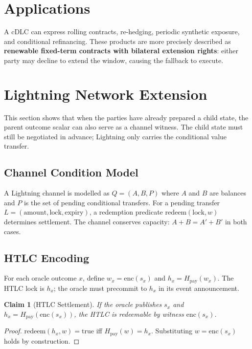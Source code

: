 \documentclass[11pt,a4paper]{article}
\theoremstyle{claimstyle}
\newtheorem{claim}{Claim}[section]
\begin{document}
\section{Applications}

A cDLC can express rolling contracts, re-hedging, periodic synthetic exposure,
and conditional refinancing. These products are more precisely described as
\textbf{renewable fixed-term contracts with bilateral extension rights}: either
party may decline to extend the window, causing the fallback to execute.

\section{Lightning Network Extension}

This section shows that when the parties have already prepared a child state,
the parent outcome scalar can also serve as a channel witness. The child state
must still be negotiated in advance; Lightning only carries the conditional
value transfer.

\subsection{Channel Condition Model}

A Lightning channel is modelled as $Q = (A, B, P)$ where $A$ and $B$ are
balances and $P$ is the set of pending conditional transfers. For a pending
transfer $L = (\mathrm{amount}, \mathrm{lock}, \mathrm{expiry})$, a redemption
predicate $\mathrm{redeem}(\mathrm{lock}, w)$ determines settlement. The channel
conserves capacity: $A + B = A' + B'$ in both cases.

\subsection{HTLC Encoding}

For each oracle outcome $x$, define $w_x = \mathrm{enc}(s_x)$ and $h_x =
H_{\mathrm{pay}}(w_x)$. The HTLC lock is $h_x$; the oracle must precommit to
$h_x$ in its event announcement.

\begin{claim}[HTLC Settlement]
If the oracle publishes $s_x$ and $h_x = H_{\mathrm{pay}}(\mathrm{enc}(s_x))$,
the HTLC is redeemable by witness $\mathrm{enc}(s_x)$.
\end{claim}
\begin{proof}
$\mathrm{redeem}(h_x, w) = \mathrm{true}$ iff $H_{\mathrm{pay}}(w) = h_x$.
Substituting $w = \mathrm{enc}(s_x)$ holds by construction.
\end{proof}
\end{document}
